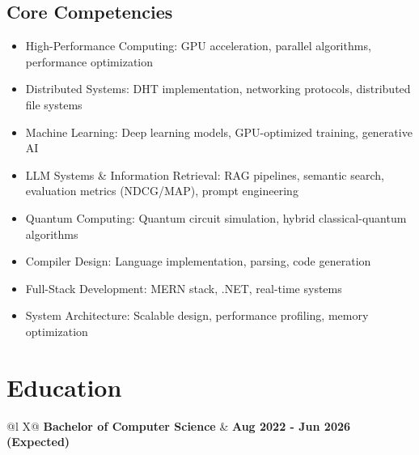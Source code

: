 \documentclass[a4paper,12pt]{article}
\begin{document}
\subsection*{Core Competencies}
\begin{itemize}[nosep,after=\strut, leftmargin=1em, itemsep=2pt]
\item High-Performance Computing: GPU acceleration, parallel algorithms, performance optimization
\item Distributed Systems: DHT implementation, networking protocols, distributed file systems
\item Machine Learning: Deep learning models, GPU-optimized training, generative AI
\item LLM Systems \& Information Retrieval: RAG pipelines, semantic search, evaluation metrics (NDCG/MAP), prompt engineering
\item Quantum Computing: Quantum circuit simulation, hybrid classical-quantum algorithms
\item Compiler Design: Language implementation, parsing, code generation
\item Full-Stack Development: MERN stack, .NET, real-time systems
\item System Architecture: Scalable design, performance profiling, memory optimization
\end{itemize}

\section{Education}
\begin{tabularx}{\linewidth}{@{}l X@{}}
\textbf{Bachelor of Computer Science} & \textbf{Aug 2022 - Jun 2026 (Expected)} \\
 \\
 \\
 \\
\end{tabularx}
\end{document}
